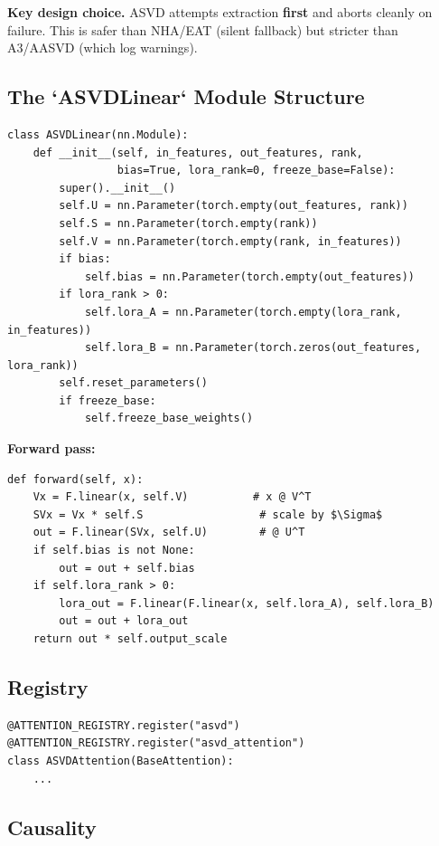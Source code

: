 \textbf{Key design choice.} ASVD attempts extraction \textbf{first} and aborts 
cleanly on failure. This is safer than NHA/EAT (silent fallback) but 
stricter than A3/AASVD (which log warnings).

\subsection{The `ASVDLinear` Module Structure}

\begin{lstlisting}
class ASVDLinear(nn.Module):
    def __init__(self, in_features, out_features, rank,
                 bias=True, lora_rank=0, freeze_base=False):
        super().__init__()
        self.U = nn.Parameter(torch.empty(out_features, rank))
        self.S = nn.Parameter(torch.empty(rank))
        self.V = nn.Parameter(torch.empty(rank, in_features))
        if bias:
            self.bias = nn.Parameter(torch.empty(out_features))
        if lora_rank > 0:
            self.lora_A = nn.Parameter(torch.empty(lora_rank, in_features))
            self.lora_B = nn.Parameter(torch.zeros(out_features, lora_rank))
        self.reset_parameters()
        if freeze_base:
            self.freeze_base_weights()
\end{lstlisting}

\textbf{Forward pass:}

\begin{lstlisting}
def forward(self, x):
    Vx = F.linear(x, self.V)          # x @ V^T
    SVx = Vx * self.S                  # scale by $\Sigma$
    out = F.linear(SVx, self.U)        # @ U^T
    if self.bias is not None:
        out = out + self.bias
    if self.lora_rank > 0:
        lora_out = F.linear(F.linear(x, self.lora_A), self.lora_B)
        out = out + lora_out
    return out * self.output_scale
\end{lstlisting}

\subsection{Registry}

\begin{lstlisting}
@ATTENTION_REGISTRY.register("asvd")
@ATTENTION_REGISTRY.register("asvd_attention")
class ASVDAttention(BaseAttention):
    ...
\end{lstlisting}

\subsection{Causality}


